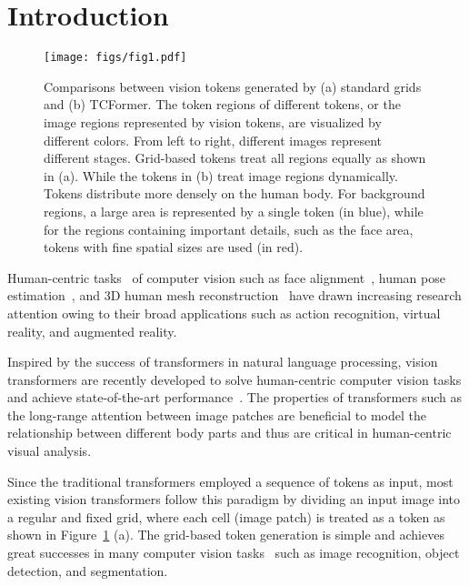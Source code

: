 \documentclass[10pt,twocolumn,letterpaper]{article}
\begin{document}
\section{Introduction}


\begin{figure}[t]
	\centering
	\texttt{[image: figs/fig1.pdf]}
	\caption{
	Comparisons between vision tokens generated by (a) standard grids and (b) TCFormer. The token regions of different tokens, or the image regions represented by vision tokens, are visualized by different colors. 
	From left to right, different images represent different stages.
	Grid-based tokens treat all regions equally as shown in (a).
	While the tokens in (b) treat image regions dynamically.
	Tokens distribute more densely on the human body. 
	For background regions, a large area is represented by a single token (in blue), while for the regions containing important details, such as the face area, tokens with fine spatial sizes are used (in red). 
	}
	\label{fig:introduction}
\end{figure}


Human-centric tasks~\cite{yu2014spectral,hu2019graph,jin2019multi,wu2021graph,duan2019trb} of computer vision such as face alignment~\cite{zhu2015face,burgos2013robust,wu2018look}, human pose estimation~\cite{toshev2014deeppose,ouyang2014multi,chu2017multi,yang2017learning,jin2020differentiable,liu2018cascaded,li2021human,newell2016stacked,xu2021vipnas,wang2021human}, and 3D human mesh reconstruction~\cite{kanazawa2018end,varol2018bodynet,kolotouros2019learning,zeng20203d} have drawn increasing research attention owing to their broad applications such as action recognition,  virtual reality, and augmented reality. 


Inspired by the success of transformers in natural language processing, vision transformers are recently developed to solve human-centric computer vision tasks and achieve state-of-the-art performance~\cite{li2021tokenpose,yuan2021hrformer,mao2021tfpose,yang2020transpose,lin2021mesh}. The properties of transformers such as the long-range attention between image patches are beneficial to model the relationship between different body parts and thus are critical in human-centric visual analysis.


Since the traditional transformers employed a sequence of tokens as input, most existing vision transformers follow this paradigm by dividing an input image into a regular and fixed grid, where each cell (image patch) is treated as a token as shown in Figure~\ref{fig:introduction} (a). The grid-based token generation is simple and achieves great successes in many computer vision tasks~\cite{dosovitskiy2020image,pvt,swin} such as image recognition, object detection, and segmentation.
\end{document}
